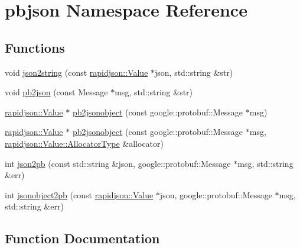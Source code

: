 \hypertarget{namespacepbjson}{}\section{pbjson Namespace Reference}
\label{namespacepbjson}
\subsection*{Functions}
\begin{DoxyCompactItemize}
\item 
void \hyperlink{namespacepbjson_a931d89259b15f87fb5ba514710433fe2}{json2string} (const \hyperlink{document_8h_a071cf97155ba72ac9a1fc4ad7e63d481}{rapidjson\+::\+Value} $\ast$json, std\+::string \&str)
\item 
void \hyperlink{namespacepbjson_a7c8080c9c186ef58e215fda623b24897}{pb2json} (const Message $\ast$msg, std\+::string \&str)
\item 
\hyperlink{document_8h_a071cf97155ba72ac9a1fc4ad7e63d481}{rapidjson\+::\+Value} $\ast$ \hyperlink{namespacepbjson_a77e3796d92415cdf030291b845a9a5d2}{pb2jsonobject} (const google\+::protobuf\+::\+Message $\ast$msg)
\item 
\hyperlink{document_8h_a071cf97155ba72ac9a1fc4ad7e63d481}{rapidjson\+::\+Value} $\ast$ \hyperlink{namespacepbjson_ab6084bc917c23308e401e1e2d672ceda}{pb2jsonobject} (const google\+::protobuf\+::\+Message $\ast$msg, \hyperlink{classGenericValue_a7beb83860c1b8d2a0e2a7da9796b2fa1}{rapidjson\+::\+Value\+::\+Allocator\+Type} \&allocator)
\item 
int \hyperlink{namespacepbjson_ad97f792e973f44aa3a8e13c9dd52b812}{json2pb} (const std\+::string \&json, google\+::protobuf\+::\+Message $\ast$msg, std\+::string \&err)
\item 
int \hyperlink{namespacepbjson_a8404dbd232535892c13710986a52e5a0}{jsonobject2pb} (const \hyperlink{document_8h_a071cf97155ba72ac9a1fc4ad7e63d481}{rapidjson\+::\+Value} $\ast$json, google\+::protobuf\+::\+Message $\ast$msg, std\+::string \&err)
\end{DoxyCompactItemize}


\subsection{Function Documentation}

